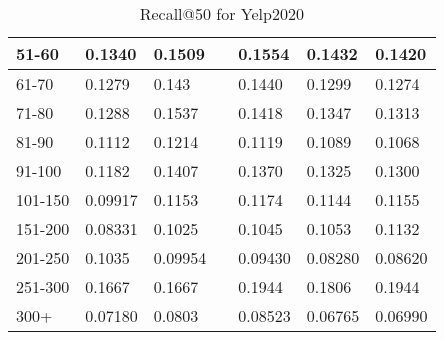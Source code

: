 \begin{table*}[]
\begin{tabular}{|l|l|l|l|l|l|l|}
    51-60     & 0.1340                         & 0.1509                         &                                & 0.1554                         & 0.1432                         & 0.1420                         \\ \hline
    61-70     & 0.1279                         & 0.143                          &                                & 0.1440                         & 0.1299                         & 0.1274                         \\ \hline
    71-80     & 0.1288                         & 0.1537                         &                                & 0.1418                         & 0.1347                         & 0.1313                         \\ \hline
    81-90     & 0.1112                         & 0.1214                         &                                & 0.1119                         & 0.1089                         & 0.1068                         \\ \hline
    91-100    & 0.1182                         & 0.1407                         &                                & 0.1370                         & 0.1325                         & 0.1300                         \\ \hline
    101-150   & 0.09917                        & 0.1153                         &                                & 0.1174                         & 0.1144                         & 0.1155                         \\ \hline
    151-200   & 0.08331                        & 0.1025                         &                                & 0.1045                         & 0.1053                         & 0.1132                         \\ \hline
    201-250   & 0.1035                         & 0.09954                        &                                & 0.09430                        & 0.08280                        & 0.08620                        \\ \hline
    251-300   & 0.1667                         & 0.1667                         &                                & 0.1944                         & 0.1806                         & 0.1944                         \\ \hline
    300+      & 0.07180                        & 0.0803                         &                                & 0.08523                        & 0.06765                        & 0.06990                        \\ \hline
    \end{tabular}
    \caption{Recall@50 for Yelp2020}
    \label{tab:yelp2020-recall-evaluation}
\end{table*}
